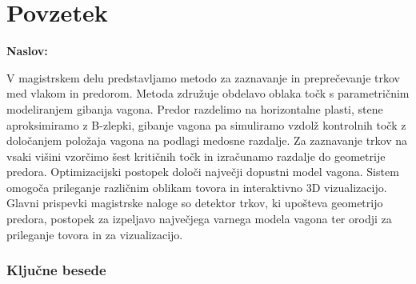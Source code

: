 \chapter*{Povzetek}

\noindent\textbf{Naslov:} \ttitle
\bigskip

V magistrskem delu predstavljamo metodo za zaznavanje in preprečevanje trkov med vlakom in predorom. Metoda združuje obdelavo oblaka točk s parametričnim modeliranjem gibanja vagona. Predor razdelimo na horizontalne plasti, stene aproksimiramo z B-zlepki, gibanje vagona pa simuliramo vzdolž kontrolnih točk z določanjem položaja vagona na podlagi medosne razdalje. Za zaznavanje trkov na vsaki višini vzorčimo šest kritičnih točk in izračunamo razdalje do geometrije predora. Optimizacijski postopek določi največji dopustni model vagona. Sistem omogoča prileganje različnim oblikam tovora in interaktivno 3D vizualizacijo. Glavni prispevki magistrske naloge so detektor trkov, ki upošteva geometrijo predora, postopek za izpeljavo največjega varnega modela vagona ter orodji za prileganje tovora in za vizualizacijo.

\subsection*{Ključne besede}
\textit{\tkeywords}
\clearemptydoublepage